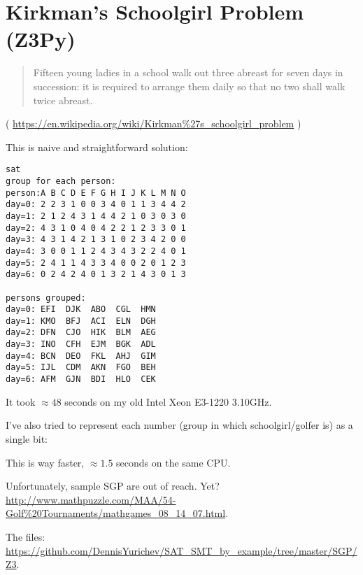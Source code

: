 \section{Kirkman's Schoolgirl Problem (Z3Py)}

\begin{framed}
\begin{quotation}

Fifteen young ladies in a school walk out three abreast for seven days in succession: it is required to arrange them daily so that no two shall walk twice abreast.

\end{quotation}
\end{framed}

( \url{https://en.wikipedia.org/wiki/Kirkman%27s_schoolgirl_problem} )

This is naive and straightforward solution:



\begin{lstlisting}
sat
group for each person:
person:A B C D E F G H I J K L M N O
day=0: 2 2 3 1 0 0 3 4 0 1 1 3 4 4 2
day=1: 2 1 2 4 3 1 4 4 2 1 0 3 0 3 0
day=2: 4 3 1 0 4 0 4 2 2 1 2 3 3 0 1
day=3: 4 3 1 4 2 1 3 1 0 2 3 4 2 0 0
day=4: 3 0 0 1 1 2 4 3 4 3 2 2 4 0 1
day=5: 2 4 1 1 4 3 3 4 0 0 2 0 1 2 3
day=6: 0 2 4 2 4 0 1 3 2 1 4 3 0 1 3

persons grouped:
day=0: EFI  DJK  ABO  CGL  HMN
day=1: KMO  BFJ  ACI  ELN  DGH
day=2: DFN  CJO  HIK  BLM  AEG
day=3: INO  CFH  EJM  BGK  ADL
day=4: BCN  DEO  FKL  AHJ  GIM
day=5: IJL  CDM  AKN  FGO  BEH
day=6: AFM  GJN  BDI  HLO  CEK
\end{lstlisting}

It took $\approx 48$ seconds on my old Intel Xeon E3-1220 3.10GHz.

I've also tried to represent each number (group in which schoolgirl/golfer is) as a single bit:



This is way faster, $\approx 1.5$ seconds on the same CPU.

Unfortunately, sample \ac{SGP} are out of reach. Yet?
\url{http://www.mathpuzzle.com/MAA/54-Golf%20Tournaments/mathgames_08_14_07.html}.

The files: \url{https://github.com/DennisYurichev/SAT_SMT_by_example/tree/master/SGP/Z3}.

